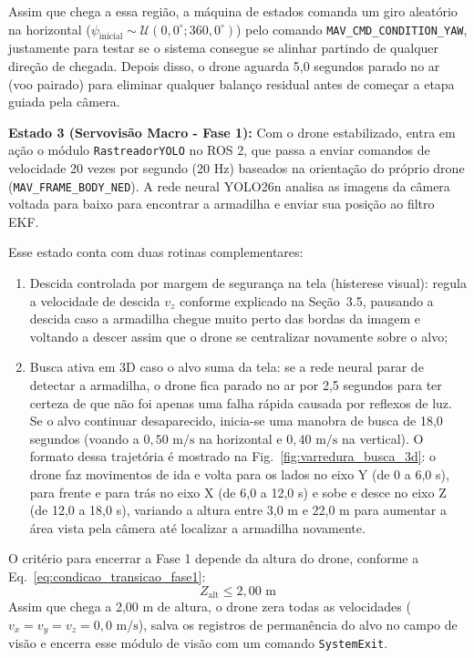 Assim que chega a essa região, a máquina de estados comanda um giro aleatório na horizontal ($\psi_{\text{inicial}} \sim \mathcal{U}(0,0^\circ; 360,0^\circ)$) pelo comando \texttt{MAV\_CMD\_CONDITION\_YAW}, justamente para testar se o sistema consegue se alinhar partindo de qualquer direção de chegada. Depois disso, o drone aguarda 5,0 segundos parado no ar (voo pairado) para eliminar qualquer balanço residual antes de começar a etapa guiada pela câmera.

\textbf{Estado 3 (Servovisão Macro - Fase 1):} Com o drone estabilizado, entra em ação o módulo \texttt{RastreadorYOLO} no ROS 2, que passa a enviar comandos de velocidade 20 vezes por segundo (20 Hz) baseados na orientação do próprio drone (\texttt{MAV\_FRAME\_BODY\_NED}). A rede neural YOLO26n analisa as imagens da câmera voltada para baixo para encontrar a armadilha e enviar sua posição ao filtro EKF.

Esse estado conta com duas rotinas complementares:
\begin{enumerate}
	\item Descida controlada por margem de segurança na tela (histerese visual): regula a velocidade de descida $v_z$ conforme explicado na Seção~3.5, pausando a descida caso a armadilha chegue muito perto das bordas da imagem e voltando a descer assim que o drone se centralizar novamente sobre o alvo;
	\item Busca ativa em 3D caso o alvo suma da tela: se a rede neural parar de detectar a armadilha, o drone fica parado no ar por 2,5 segundos para ter certeza de que não foi apenas uma falha rápida causada por reflexos de luz. Se o alvo continuar desaparecido, inicia-se uma manobra de busca de 18,0 segundos (voando a $0,50\text{ m/s}$ na horizontal e $0,40\text{ m/s}$ na vertical). O formato dessa trajetória é mostrado na Fig.~\ref{fig:varredura_busca_3d}: o drone faz movimentos de ida e volta para os lados no eixo Y (de 0 a 6,0 s), para frente e para trás no eixo X (de 6,0 a 12,0 s) e sobe e desce no eixo Z (de 12,0 a 18,0 s), variando a altura entre 3,0 m e 22,0 m para aumentar a área vista pela câmera até localizar a armadilha novamente.
\end{enumerate}

O critério para encerrar a Fase 1 depende da altura do drone, conforme a Eq.~\eqref{eq:condicao_transicao_fase1}:
\begin{equation}
	Z_{\text{alt}} \le 2,00\text{ m}
	\label{eq:condicao_transicao_fase1}
\end{equation}
Assim que chega a 2,00 m de altura, o drone zera todas as velocidades ($v_x = v_y = v_z = 0,0\text{ m/s}$), salva os registros de permanência do alvo no campo de visão e encerra esse módulo de visão com um comando \texttt{SystemExit}.

